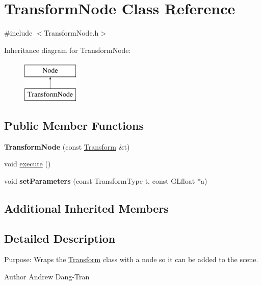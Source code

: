 \hypertarget{classTransformNode}{\section{Transform\-Node Class Reference}
\label{classTransformNode}
}


{\ttfamily \#include $<$Transform\-Node.\-h$>$}

Inheritance diagram for Transform\-Node\-:\begin{figure}[H]
\begin{center}
\leavevmode
\includegraphics[height=2.000000cm]{classTransformNode}
\end{center}
\end{figure}
\subsection*{Public Member Functions}
\begin{DoxyCompactItemize}
\item 
\hypertarget{classTransformNode_aaf9b373c0d1b27b8fda450820ed52e69}{{\bfseries Transform\-Node} (const \hyperlink{classTransform}{Transform} \&t)}\label{classTransformNode_aaf9b373c0d1b27b8fda450820ed52e69}

\item 
void \hyperlink{classTransformNode_a746be4bb9fd24686ff2a6ad49c08c986}{execute} ()
\item 
\hypertarget{classTransformNode_ab73f2fb928f777deca2e093a7d909a71}{void {\bfseries set\-Parameters} (const Transform\-Type t, const G\-Lfloat $\ast$a)}\label{classTransformNode_ab73f2fb928f777deca2e093a7d909a71}

\end{DoxyCompactItemize}
\subsection*{Additional Inherited Members}


\subsection{Detailed Description}
Purpose\-: Wraps the \hyperlink{classTransform}{Transform} class with a node so it can be added to the scene. \begin{DoxyAuthor}{Author}
Andrew Dang-\/\-Tran 
\end{DoxyAuthor}



